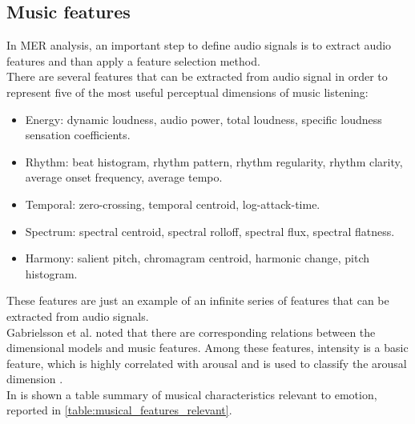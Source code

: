 \subsection{Music features}\label{music_features}
In MER analysis, an important step to define audio signals is to extract audio features and than apply a feature selection method.
\\
There are several features that can be extracted from audio signal in order to represent five of the most useful perceptual dimensions of music listening:
\begin{itemize}
	\item Energy: dynamic loudness, audio power, total loudness, specific loudness sensation coefficients.
	\item Rhythm: beat histogram, rhythm pattern, rhythm regularity, rhythm clarity, average onset frequency, average tempo.
	\item Temporal: zero-crossing, temporal centroid, log-attack-time.
	\item Spectrum: spectral centroid, spectral rolloff, spectral flux, spectral flatness.
	\item Harmony: salient pitch, chromagram centroid, harmonic change, pitch histogram.
\end{itemize}
These features are just an example of an infinite series of features that can be extracted from audio signals.
\\ \indent
Gabrielsson et al. \cite{gabrielsson2001influence} noted that there are corresponding relations between the dimensional models and music features. Among these features, intensity is a basic feature, which is highly correlated with arousal and is used to classify the arousal dimension \cite{zhang2017feature}.
\\
In \cite{panda2018novel} is shown a table summary of musical characteristics relevant to emotion, reported in \ref{table:musical_features_relevant}.
